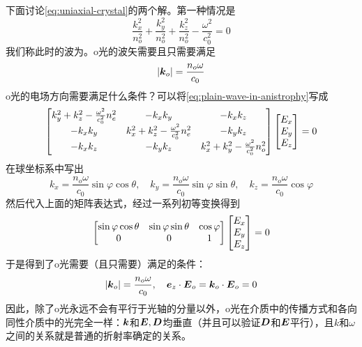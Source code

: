 下面讨论\eqref{eq:uniaxial-crystal}的两个解。第一种情况是
\[
    \frac{k_x^2}{n_o^2} + \frac{k_y^2}{n_o^2} + \frac{k_z^2}{n_o^2} - \frac{\omega^2}{c_0^2} = 0
\]
我们称此时的波为。o光的波矢需要且只需要满足
\[
    \abs{\vb*{k}_o} = \frac{n_o \omega}{c_0}
\]
o光的电场方向需要满足什么条件？可以将\eqref{eq:plain-wave-in-anistrophy}写成
\[
    \bmqty{
        k_y^2 + k_z^2 - \frac{\omega^2}{c_0^2} n_e^2 & -k_x k_y & - k_x k_z \\
        - k_x k_y & k_x^2 + k_z^2 - \frac{\omega^2}{c_0^2} n_e^2 & -k_y k_z \\
        -k_x k_z & -k_y k_z & k_x^2 + k_y^2 - \frac{\omega^2}{c_0^2} n_o^2
    }
    \bmqty{
        E_x \\ E_y \\ E_z
    } = 0
\]
在球坐标系中写出
\[
    k_x = \frac{n_o \omega}{c_0} \sin \varphi \cos \theta, 
    \quad k_y = \frac{n_o \omega}{c_0} \sin \varphi \sin \theta, \quad k_z = \frac{n_o \omega}{c_0} \cos \varphi
\]
然后代入上面的矩阵表达式，经过一系列初等变换得到
\[
    \bmqty{
        \sin \varphi \cos \theta & \sin \varphi \sin \theta & \cos \varphi \\
        0 & 0 & 1
    }
    \bmqty{E_x \\ E_y \\ E_z} = 0
\]
于是得到了o光需要（且只需要）满足的条件：
\begin{equation}
    \abs{\vb*{k}_o} = \frac{n_o \omega}{c_0}, \quad\vb*{e}_z \cdot \vb*{E}_o = \vb*{k}_o \cdot \vb*{E}_o = 0
    \label{eq:o-light}
\end{equation}
因此，除了o光永远不会有平行于光轴的分量以外，o光在介质中的传播方式和各向同性介质中的光完全一样：$\vb*{k}$和$\vb*{E}, \vb*{D}$均垂直（并且可以验证$\vb*{D}$和$\vb*{E}$平行），且$k$和$\omega$之间的关系就是普通的折射率确定的关系。

